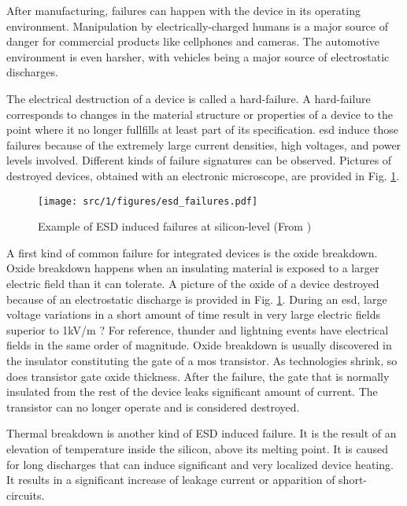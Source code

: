 After manufacturing, failures can happen with the device in its operating environment.
Manipulation by electrically-charged humans is a major source of danger for commercial products like cellphones and cameras.
The automotive environment is even harsher, with vehicles being a major source of electrostatic discharges.

The electrical destruction of a device is called a hard-failure.
A hard-failure corresponds to changes in the material structure or properties of a device to the point where it no longer fullfills at least part of its specification.
\gls{esd} induce those failures because of the extremely large current densities, high voltages, and power levels involved.
Different kinds of failure signatures can be observed.
Pictures of destroyed devices, obtained with an electronic microscope, are provided in Fig. \ref{fig:silicon-level-failures}.

\begin{figure}[!h]
  \centering
  \texttt{[image: src/1/figures/esd\_failures.pdf]}
  \caption{Example of ESD induced failures at silicon-level (From \cite{esd-robust-product})}
  \label{fig:silicon-level-failures}
\end{figure}


A first kind of common failure for integrated devices is the oxide breakdown.
Oxide breakdown happens when an insulating material is exposed to a larger electric field than it can tolerate.
A picture of the oxide of a device destroyed because of an electrostatic discharge is provided in Fig. \ref{fig:silicon-level-failures}.
During an \gls{esd}, large voltage variations in a short amount of time result in very large electric fields superior to 1kV/m ?
For reference, thunder and lightning events have electrical fields in the same order of magnitude.
Oxide breakdown is usually discovered in the insulator constituting the gate of a \gls{mos} transistor.
As technologies shrink, so does transistor gate oxide thickness.
After the failure, the gate that is normally insulated from the rest of the device leaks significant amount of current.
The transistor can no longer operate and is considered destroyed.

Thermal breakdown is another kind of ESD induced failure.
It is the result of an elevation of temperature inside the silicon, above its melting point.
It is caused for long discharges that can induce significant and very localized device heating.
It results in a significant increase of leakage current or apparition of short-circuits.

